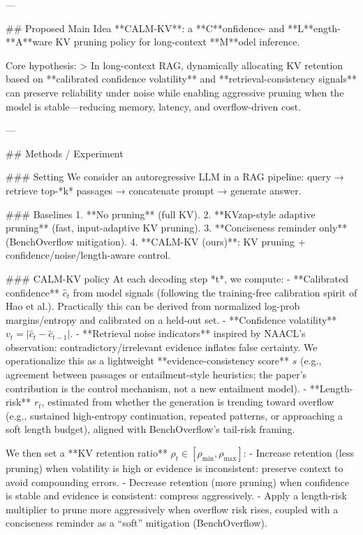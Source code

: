 ---

## Proposed Main Idea  
**CALM-KV**: a **C**onfidence- and **L**ength-**A**ware KV pruning policy for long-context **M**odel inference.

Core hypothesis:  
> In long-context RAG, dynamically allocating KV retention based on **calibrated confidence volatility** and **retrieval-consistency signals** can preserve reliability under noise while enabling aggressive pruning when the model is stable—reducing memory, latency, and overflow-driven cost.

---

## Methods / Experiment  

### Setting  
We consider an autoregressive LLM in a RAG pipeline: query → retrieve top-*k* passages → concatenate prompt → generate answer.

### Baselines  
1. **No pruning** (full KV).  
2. **KVzap-style adaptive pruning** (fast, input-adaptive KV pruning).  
3. **Conciseness reminder only** (BenchOverflow mitigation).  
4. **CALM-KV (ours)**: KV pruning + confidence/noise/length-aware control.

### CALM-KV policy  
At each decoding step *t*, we compute:
- **Calibrated confidence** \( \hat{c}_t \) from model signals (following the training-free calibration spirit of Hao et al.). Practically this can be derived from normalized log-prob margins/entropy and calibrated on a held-out set.  
- **Confidence volatility** \( v_t = |\hat{c}_t - \hat{c}_{t-1}| \).  
- **Retrieval noise indicators** inspired by NAACL’s observation: contradictory/irrelevant evidence inflates false certainty. We operationalize this as a lightweight **evidence-consistency score** \( s \) (e.g., agreement between passages or entailment-style heuristics; the paper’s contribution is the control mechanism, not a new entailment model).  
- **Length-risk** \( r_t \), estimated from whether the generation is trending toward overflow (e.g., sustained high-entropy continuation, repeated patterns, or approaching a soft length budget), aligned with BenchOverflow’s tail-risk framing.

We then set a **KV retention ratio** \( \rho_t \in [\rho_{\min}, \rho_{\max}] \):
- Increase retention (less pruning) when volatility is high or evidence is inconsistent: preserve context to avoid compounding errors.
- Decrease retention (more pruning) when confidence is stable and evidence is consistent: compress aggressively.
- Apply a length-risk multiplier to prune more aggressively when overflow risk rises, coupled with a conciseness reminder as a “soft” mitigation (BenchOverflow).

